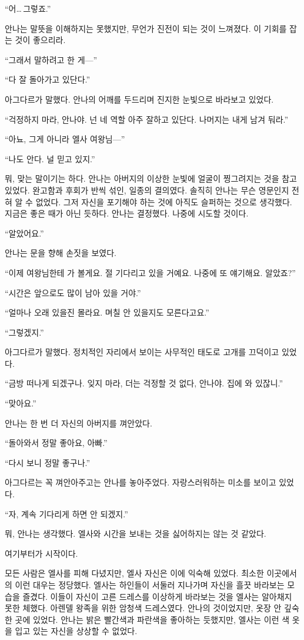 ``어\ldots\,그렇죠.''

안나는 말뜻을 이해하지는 못했지만, 무언가 진전이 되는 것이 느껴졌다. 이 기회를 잡는 것이 좋으리라.

``그래서 말하려고 한 게—''

``다 잘 돌아가고 있단다.''

아그다르가 말했다. 안나의 어깨를 두드리며 진지한 눈빛으로 바라보고 있었다.

``걱정하지 마라, 안나야. 넌 네 역할 아주 잘하고 있단다. 나머지는 내게 남겨 둬라.''

``아뇨, 그게 아니라 엘사 여왕님—''

``나도 안다. 널 믿고 있지.''

뭐, 맞는 말이기는 하다. 안나는 아버지의 이상한 눈빛에 얼굴이 찡그려지는 것을 참고 있었다. 완고함과 후회가 반씩 섞인, 일종의 결의였다. 솔직히 안나는 무슨 영문인지 전혀 알 수 없었다. 그저 자신을 포기해야 하는 것에 아직도 슬퍼하는 것으로 생각했다. 지금은 좋은 때가 아닌 듯하다. 안나는 결정했다. 나중에 시도할 것이다.

``알았어요.''

안나는 문을 향해 손짓을 보였다.

``이제 여왕님한테 가 볼게요. 절 기다리고 있을 거예요. 나중에 또 얘기해요. 알았죠?''

``시간은 앞으로도 많이 남아 있을 거야.''

``얼마나 오래 있을진 몰라요. 며칠 안 있을지도 모른다고요.''

``그렇겠지.''

아그다르가 말했다. 정치적인 자리에서 보이는 사무적인 태도로 고개를 끄덕이고 있었다.

``금방 떠나게 되겠구나. 잊지 마라, 더는 걱정할 것 없다, 안나야. 집에 와 있잖니.''

``맞아요.''

안나는 한 번 더 자신의 아버지를 껴안았다.

``돌아와서 정말 좋아요, 아빠.''

``다시 보니 정말 좋구나.''

아그다르는 꼭 껴안아주고는 안나를 놓아주었다. 자랑스러워하는 미소를 보이고 있었다.

``자, 계속 기다리게 하면 안 되겠지.''

뭐, 안나는 생각했다. 엘사와 시간을 보내는 것을 싫어하지는 않는 것 같았다.

여기부터가 시작이다.

\textbreak

모든 사람은 엘사를 피해 다녔지만, 엘사 자신은 이에 익숙해 있었다. 최소한 이곳에서의 이런 대우는 정당했다. 엘사는 하인들이 서둘러 지나가며 자신을 흘끗 바라보는 모습을 즐겼다. 이들이 자신이 고른 드레스를 이상하게 바라보는 것을 엘사는 알아채지 못한 체했다. 아렌델 왕족을 위한 암청색 드레스였다. 안나의 것이었지만, 옷장 안 깊숙한 곳에 있었다. 안나는 밝은 빨간색과 파란색을 좋아하는 듯했지만, 엘사는 이런 색 옷을 입고 있는 자신을 상상할 수 없었다.

